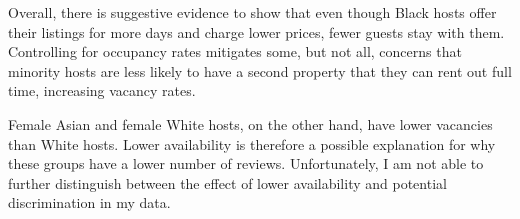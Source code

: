Overall, there is suggestive evidence to show that even though Black hosts offer their listings for more days and charge lower prices, fewer guests stay with them. Controlling for occupancy rates mitigates some, but not all, concerns that minority hosts are less likely to have a second property that they can rent out full time, increasing vacancy rates. 

Female Asian and female White hosts, on the other hand, have lower vacancies than White hosts. Lower availability is therefore a possible explanation for why these groups have a lower number of reviews. Unfortunately, I am not able to further distinguish between the effect of lower availability and potential discrimination in my data. 














